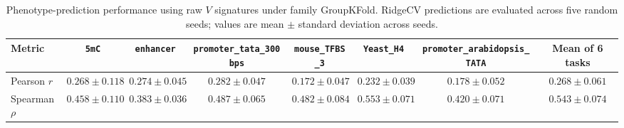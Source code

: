 \begin{table}[t]
  \centering
  \caption{Phenotype-prediction performance using raw $V$ signatures under family GroupKFold. RidgeCV predictions are evaluated across five random seeds; values are mean $\pm$ standard deviation across seeds.}
  \label{tab:fig4b_v_family_groupkfold}
  \small
  \setlength{\tabcolsep}{4.5pt}
  \begin{tabular}{l c c c c c c c}
    \toprule
    Metric & \texttt{5mC} & \texttt{enhancer} & \texttt{promoter\_tata\_300bps} & \texttt{mouse\_TFBS\_3} & \texttt{Yeast\_H4} & \texttt{promoter\_arabidopsis\_TATA} & Mean of 6 tasks \\
    \midrule
    Pearson $r$ & $0.268 \pm 0.118$ & $0.274 \pm 0.045$ & $0.282 \pm 0.047$ & $0.172 \pm 0.047$ & $0.232 \pm 0.039$ & $0.178 \pm 0.052$ & $0.268 \pm 0.061$ \\
    Spearman $\rho$ & $0.458 \pm 0.110$ & $0.383 \pm 0.036$ & $0.487 \pm 0.065$ & $0.482 \pm 0.084$ & $0.553 \pm 0.071$ & $0.420 \pm 0.071$ & $0.543 \pm 0.074$ \\
    \bottomrule
  \end{tabular}
\end{table}
